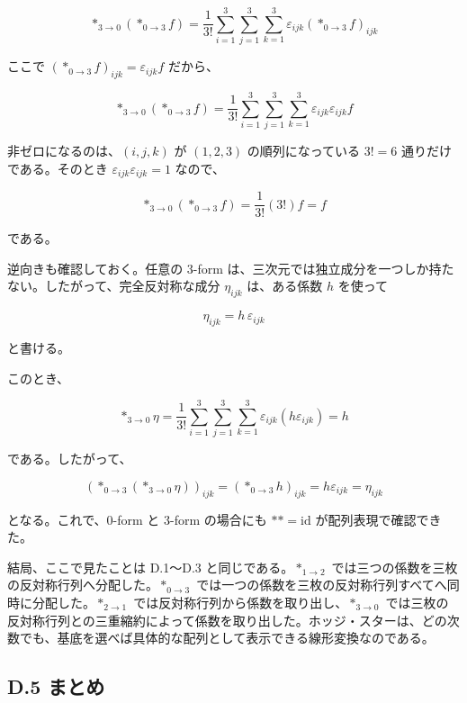 \documentclass[a4paper,12pt,openany]{book}
\begin{document}
\[
\ast_{3\to0}(\ast_{0\to3}f)
=
\frac{1}{3!}
\sum_{i=1}^{3}
\sum_{j=1}^{3}
\sum_{k=1}^{3}
\varepsilon_{ijk}(\ast_{0\to3}f)_{ijk}
\]

ここで \((\ast_{0\to3}f)_{ijk}=\varepsilon_{ijk}f\) だから、

\[
\ast_{3\to0}(\ast_{0\to3}f)
=
\frac{1}{3!}
\sum_{i=1}^{3}
\sum_{j=1}^{3}
\sum_{k=1}^{3}
\varepsilon_{ijk}\varepsilon_{ijk}f
\]

非ゼロになるのは、\((i,j,k)\) が \((1,2,3)\) の順列になっている \(3!=6\)
通りだけである。そのとき \(\varepsilon_{ijk}\varepsilon_{ijk}=1\)
なので、

\[
\ast_{3\to0}(\ast_{0\to3}f)
=
\frac{1}{3!}(3!)f
=
f
\]

である。

逆向きも確認しておく。任意の \(3\)-form
は、三次元では独立成分を一つしか持たない。したがって、完全反対称な成分
\(\eta_{ijk}\) は、ある係数 \(h\) を使って

\[
\eta_{ijk}
=
h\,\varepsilon_{ijk}
\]

と書ける。

このとき、

\[
\ast_{3\to0}\eta
=
\frac{1}{3!}
\sum_{i=1}^{3}
\sum_{j=1}^{3}
\sum_{k=1}^{3}
\varepsilon_{ijk}(h\varepsilon_{ijk})
=
h
\]

である。したがって、

\[
(\ast_{0\to3}(\ast_{3\to0}\eta))_{ijk}
=
(\ast_{0\to3}h)_{ijk}
=
h\varepsilon_{ijk}
=
\eta_{ijk}
\]

となる。これで、\(0\)-form と \(3\)-form の場合にも
\(\ast\ast=\mathrm{id}\) が配列表現で確認できた。

結局、ここで見たことは D.1〜D.3 と同じである。\(\ast_{1\to2}\)
では三つの係数を三枚の反対称行列へ分配した。\(\ast_{0\to3}\)
では一つの係数を三枚の反対称行列すべてへ同時に分配した。\(\ast_{2\to1}\)
では反対称行列から係数を取り出し、\(\ast_{3\to0}\)
では三枚の反対称行列との三重縮約によって係数を取り出した。ホッジ・スターは、どの次数でも、基底を選べば具体的な配列として表示できる線形変換なのである。

\hypertarget{d.5-ux307eux3068ux3081}{%
\subsection*{D.5 まとめ}\label{d.5-ux307eux3068ux3081}}
\end{document}
